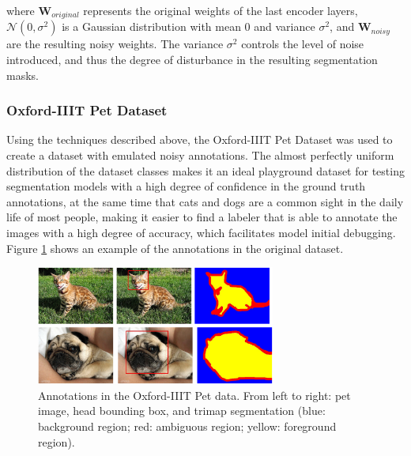 where $\mathbf{W}_{original}$ represents the original weights of the
last encoder layers, $\mathcal{N}(0, \sigma^2)$ is a Gaussian
distribution with mean 0 and variance $\sigma^2$, and
$\mathbf{W}_{noisy}$ are the resulting noisy weights. The variance
$\sigma^2$ controls the level of noise introduced, and thus the
degree of disturbance in the resulting segmentation masks.

\subsubsection{Oxford-IIIT Pet Dataset}

Using the techniques described above, the Oxford-IIIT Pet Dataset
\cite{ParkhiEtAl2012} was used to create a dataset with emulated noisy
annotations. The almost perfectly uniform distribution of the dataset classes
makes it an ideal playground dataset for testing segmentation models
with a high degree of confidence in the ground truth annotations, at
the same time that cats and dogs are a common sight in the daily life of
most people, making it easier to find a labeler that is able to annotate
the images with a high degree of accuracy, which facilitates model
initial debugging. Figure \ref{fig:oxford_iii_overview} shows an example
of the annotations in the original dataset.

\begin{figure}[h]
  \centering
  \includegraphics[width=0.7\textwidth]{Cap2/Figures/oxford_iii_overview.png}
  \caption{Annotations in the Oxford-IIIT Pet data. From left
    to right: pet image, head bounding box, and trimap segmentation
    (blue: background region; red: ambiguous region; yellow: foreground
  region).}
  \label{fig:oxford_iii_overview}
\end{figure}

